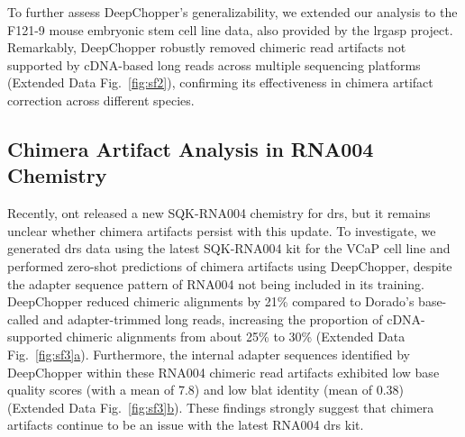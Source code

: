\documentclass[pdflatex,sn-nature, lineno]{sn-jnl}%
\newcommand{\edfigref}[2]{Extended Data Fig.~\hyperref[#1]{\ref*{#1}#2}}
\begin{document}
To further assess DeepChopper's generalizability, we extended our analysis to the F121-9 mouse embryonic stem cell line data, also provided by the \gls{lrgasp} project.
Remarkably, DeepChopper robustly removed chimeric read artifacts not supported by cDNA-based long reads across multiple sequencing platforms (\edfigref{fig:sf2}{}), confirming its effectiveness in chimera artifact correction across different species.

\subsection{Chimera Artifact Analysis in RNA004 Chemistry}

Recently, \gls{ont} released a new SQK-RNA004 chemistry for \gls{drs}, but it remains unclear whether chimera artifacts persist with this update.
To investigate, we generated \gls{drs} data using the latest SQK-RNA004 kit for the VCaP cell line and performed zero-shot predictions of chimera artifacts using DeepChopper, despite the adapter sequence pattern of RNA004 not being included in its training.
DeepChopper reduced chimeric alignments by 21\% compared to Dorado's base-called and adapter-trimmed long reads, increasing the proportion of cDNA-supported chimeric alignments from about 25\% to 30\% (\edfigref{fig:sf3}{a}).
Furthermore, the internal adapter sequences identified by DeepChopper within these RNA004 chimeric read artifacts exhibited low base quality scores (with a mean of 7.8) and low \gls{blat} identity (mean of 0.38) (\edfigref{fig:sf3}{b}).
These findings strongly suggest that chimera artifacts continue to be an issue with the latest RNA004 \gls{drs} kit.
\end{document}
